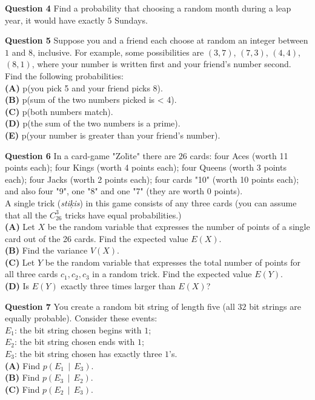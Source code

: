 \documentclass[jou]{apa6}
\begin{document}
\vspace{10pt}
{\bf Question 4} Find a probability that choosing a random month during a leap year, it would have exactly $5$ Sundays.

\vspace{10pt}
{\bf Question 5} Suppose you and a friend each choose at random an integer between $1$ and $8$, inclusive. For example, some
possibilities are $(3,7)$, $(7,3)$, $(4,4)$, $(8,1)$, where your number is written first and your friend’s number second.
Find the following probabilities:\\
{\bf (A)} p(you pick 5 and your friend picks 8).\\
{\bf (B)} p(sum of the two numbers picked is < 4).\\
{\bf (C)} p(both numbers match).\\
{\bf (D)} p(the sum of the two numbers is a prime).\\
{\bf (E)} p(your number is greater than your friend’s number).

\vspace{10pt}
{\bf Question 6} In a card-game "Zol\={\i}te" there are $26$ cards: four Aces (worth 11 points each); 
four Kings (worth 4 points each); four Queens (worth 3 points each); four Jacks (worth 2 points each); 
four cards "10" (worth 10 points each); and also four "9", one "8" and one "7" (they are worth 0 points).\\
A single trick ({\em sti\c{k}is}) in this game consists of any three cards (you can assume that all the 
$C_{26}^3$ tricks have equal probabilities.)\\
{\bf (A)} Let $X$ be the random variable that expresses the number of points of a single card out 
of the 26 cards.  Find the expected value $E(X)$.\\
{\bf (B)} Find the variance $V(X)$.\\
{\bf (C)} Let $Y$ be the random variable that expresses the total number of points for all three
cards $c_1,c_2,c_3$ in a random trick. Find the expected value $E(Y)$.\\
{\bf (D)} Is $E(Y)$ exactly three times larger than $E(X)$?

\vspace{10pt}
{\bf Question 7} You create a random bit string of length five (all $32$ bit strings are equally probable). Consider
these events:\\
$E_1$: the bit string chosen begins with $1$;\\
$E_2$: the bit string chosen ends with $1$;\\
$E_3$: the bit string chosen has exactly three $1$’s.\\
{\bf (A)} Find $p(E_1 \,\mid\, E_3)$.\\
{\bf (B)} Find $p(E_3 \,\mid\, E_2)$.\\
{\bf (C)} Find $p(E_2 \,\mid\, E_3)$.
\end{document}
